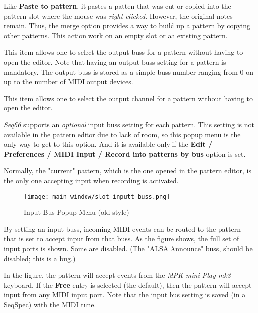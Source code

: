    Like \textbf{Paste to pattern}, it pastes a
   patten that was cut or copied into the pattern slot where the mouse was
   \textsl{right-clicked}.  However, the original notes remain.  Thus, the merge
   option provides a way to build up a pattern by copying other patterns.
   This action work on an empty slot or an existing pattern.

   This item allows one to select the output buss for a pattern without having
   to open the editor.
   Note that having an output buss setting for a pattern is mandatory.
   The output buss is stored as a simple buss number ranging from 0 on up to
   the number of MIDI output devices.

   This item allows one to select the output channel for a pattern without
   having to open the editor.

   \textsl{Seq66} supports an
   \textsl{optional} input buss setting for each pattern.
   This setting is not available in the pattern editor due to lack
   of room, so this popup menu is the only way to get to this option.
   And it is available only if the
   \textbf{Edit / Preferences / MIDI Input / Record into patterns by
   bus} option is set.

   Normally, the "current" pattern, which is the one opened in
   the pattern editor, is the only one accepting input when
   recording is activated.

\begin{figure}[H]
   \centering 
   \texttt{[image: main-window/slot-inputt-buss.png]}
   \caption{Input Bus Popup Menu (old style)}
   \label{fig:slot_input_bus}
\end{figure}

   By setting an input buss, incoming MIDI events can be routed to
   the pattern that is set to accept input from that buss.
   As the figure shows, the full set of input ports is shown.
   Some are disabled. (The "ALSA Announce" buss, should be disabled; this
   is a bug.)

   In the figure, the pattern will accept events from
   the \textsl{MPK mini Play mk3} keyboard.
   If the \textbf{Free} entry is selected (the default), then
   the pattern will accept input from any MIDI input port.
   Note that the input bus setting is saved (in a SeqSpec) with the
   MIDI tune.

